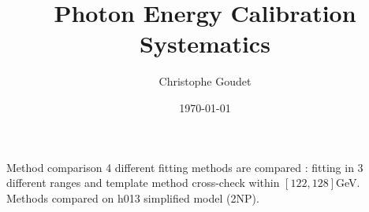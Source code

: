 \documentclass[a4paper]{beamer}
\title[$H\gamma\gamma$ couplings]{Photon Energy Calibration Systematics}
\author[Goudet]{Christophe Goudet}
\institute[LAL]{\texttt{[image: /home/goudet/Documents/LAL/ExternalPlot/LAL.jpg]} }
\date{\today}
\begin{document}
\transboxin




\begin{frame}{Method comparison}
  4 different fitting methods are compared : fitting in 3 different ranges and template method cross-check within $[122, 128]$GeV.
  Methods compared on h013 simplified model (2NP).
  

\end{frame}
\end{document}
